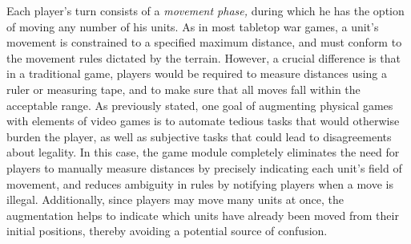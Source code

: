 \documentclass{thesis}
\begin{document}
Each player's turn consists of a \emph{movement phase,} during which he has the option of moving any number of his units. As in most tabletop war games, a unit's movement is constrained to a specified maximum distance, and must conform to the movement rules dictated by the terrain. However, a crucial difference is that in a traditional game, players would be required to measure distances using a ruler or measuring tape, and to make sure that all moves fall within the acceptable range. As previously stated, one goal of augmenting physical games with elements of video games is to automate tedious tasks that would otherwise burden the player, as well as subjective tasks that could lead to disagreements about legality. In this case, the game module completely eliminates the need for players to manually measure distances by precisely indicating each unit's field of movement, and reduces ambiguity in rules by notifying players when a move is illegal. Additionally, since players may move many units at once, the augmentation helps to indicate which units have already been moved from their initial positions, thereby avoiding a potential source of confusion.
\end{document}
